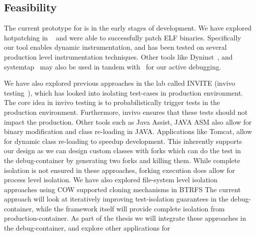 \subsection{Feasibility}
\label{sec:guided_feasibility}

The current prototype for \activedebugging is in the early stages of development.
We have explored hotpatching in ~\cite{iprobe} and were able to successfully patch ELF binaries. 
Specifically our \iprobe tool enables dynamic instrumentation, and has been tested on several production level instrumentation techniques.
Other tools like Dyninst~\cite{dyninst}, and systemtap~\cite{systemtap} may also be used in tandem with ~\iprobe for our active debugging.

We have also explored previous approaches in the lab called INVITE (invivo testing~\cite{invivo}), which has looked into isolating test-cases in production environment. 
The core idea in invivo testing is to probabilistically trigger tests in the production environment. 
Furthermore, invivo ensures that these tests should not impact the production.
Other tools such as Java Assist, JAVA ASM also allow for binary modification and class re-loading in JAVA.
Applications like Tomcat, allow for dynamic class re-loading to speedup development. 
This inherently supports our design as we can design custom classes with forks which can do the test in the debug-container by generating two forks and killing them.
While complete isolation is not ensured in these approaches, forking execution does allow for process level isolation.
We have also explored file-system level isolation approaches using COW supported cloning mechanisms in BTRFS
The current approach will look at iteratively improving test-isolation guarantees in the debug-container, while the framework itself will provide complete isolation from production-container.
As part of the thesis we will integrate these approaches in the debug-container, and explore other applications for \livedebugging